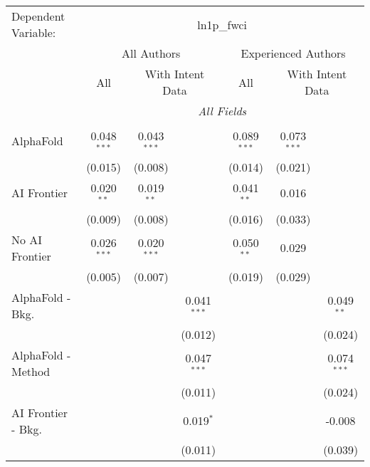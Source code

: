 \begingroup
\centering
\begin{tabular}{lcccccc}
   \tabularnewline \midrule \midrule
   Dependent Variable: & \multicolumn{6}{c}{ln1p\_fwci}\\
 & \multicolumn{3}{c}{All Authors} & \multicolumn{3}{c}{Experienced Authors} \\
\cmidrule(lr){2-4} \cmidrule(lr){5-7}
 & \multicolumn{1}{c}{All} & \multicolumn{2}{c}{With Intent Data} & \multicolumn{1}{c}{All} & \multicolumn{2}{c}{With Intent Data} \\
\cmidrule(lr){2-2} \cmidrule(lr){3-4} \cmidrule(lr){5-5} \cmidrule(lr){6-7}
 & \multicolumn{6}{c}{\textit{All Fields}} \\ \\
   AlphaFold               & 0.048$^{***}$ & 0.043$^{***}$ &               & 0.089$^{***}$ & 0.073$^{***}$ &   \\   
                           & (0.015)       & (0.008)       &               & (0.014)       & (0.021)       &   \\   
   AI Frontier             & 0.020$^{**}$  & 0.019$^{**}$  &               & 0.041$^{**}$  & 0.016         &   \\   
                           & (0.009)       & (0.008)       &               & (0.016)       & (0.033)       &   \\   
   No AI Frontier          & 0.026$^{***}$ & 0.020$^{***}$ &               & 0.050$^{**}$  & 0.029         &   \\   
                           & (0.005)       & (0.007)       &               & (0.019)       & (0.029)       &   \\   
   AlphaFold - Bkg.        &               &               & 0.041$^{***}$ &               &               & 0.049$^{**}$\\   
                           &               &               & (0.012)       &               &               & (0.024)\\   
   AlphaFold - Method      &               &               & 0.047$^{***}$ &               &               & 0.074$^{***}$\\   
                           &               &               & (0.011)       &               &               & (0.024)\\   
   AI Frontier - Bkg.      &               &               & 0.019$^{*}$   &               &               & -0.008\\   
                           &               &               & (0.011)       &               &               & (0.039)\\   

\end{tabular}
